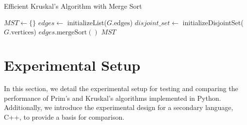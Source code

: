 \documentclass[a4paper, 10pt, twocolumn]{article}
\begin{document}
\begin{algorithm}
\caption{Efficient Kruskal's Algorithm with Merge Sort}
\BlankLine
$MST \leftarrow \{\}$\;
$edges \leftarrow$ initializeList($G.\text{edges}$)\;
$disjoint\_set \leftarrow$ initializeDisjointSet($G.\text{vertices}$)\;
$edges.\text{mergeSort}()$\;
\Return $MST$\;
\end{algorithm}

\twocolumn
\section{Experimental Setup}
In this section, we detail the experimental setup for testing and comparing the performance of Prim’s and Kruskal’s algorithms implemented in Python. Additionally, we introduce the experimental design for a secondary language, C++, to provide a basis for comparison.
\end{document}
